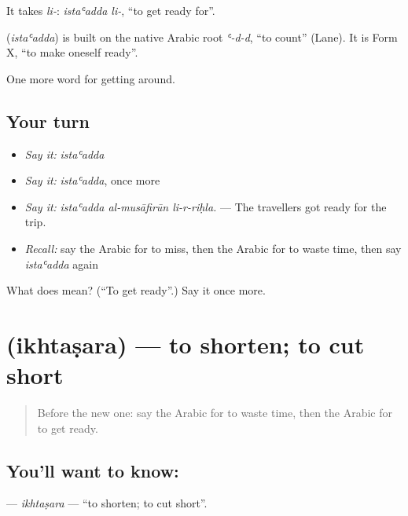 It takes \emph{li-}: \emph{istaʿadda li-}, \textquotedblleft{}to get ready for\textquotedblright{}.

\begin{cousinweb}
\textbf{} (\emph{istaʿadda}) is built on the native Arabic root \emph{ʿ-d-d}, \textquotedblleft{}to count\textquotedblright{} (Lane). It is Form X, \textquotedblleft{}to make oneself ready\textquotedblright{}.
\end{cousinweb}

\begin{grammarlens}[title={What you've built}]
One more word for getting around.
\end{grammarlens}

\subsection*{Your turn}
\begin{itemize}
\raggedright
  \item \emph{Say it:} \emph{istaʿadda}
  \item \emph{Say it:} \emph{istaʿadda}, once more
  \item \emph{Say it:} \emph{istaʿadda al-musāfirūn li-r-riḥla.} — The travellers got ready for the trip.
  \item \emph{Recall:} say the Arabic for to miss, then the Arabic for to waste time, then say \emph{istaʿadda} again
\end{itemize}

\begin{tcolorbox}[breakable,colback=teal!4,colframe=teal!35!black,title={Before you move on}]
What does  mean? (\textquotedblleft{}To get ready\textquotedblright{}.) Say it once more.
\end{tcolorbox}
\section[\texorpdfstring{\ar{اختصر} (ikhtaṣara)}{اختصر (ikhtaṣara)}]{ (ikhtaṣara) — to shorten; to cut short}

\label{lesson:AR-C462-ikhtasara}



\begin{quote}
Before the new one: say the Arabic for to waste time, then the Arabic for to get ready.
\end{quote}

\subsection*{You'll want to know: }
\textbf{} — \emph{ikhtaṣara} — \textquotedblleft{}to shorten; to cut short\textquotedblright{}.

